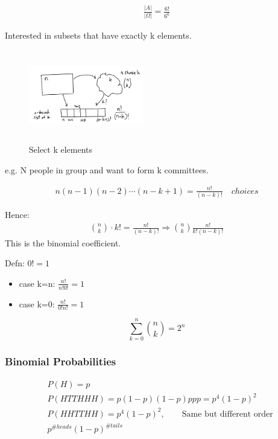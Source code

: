 \begin{align*}
\frac{|A|}{|\Omega|} = \frac{6!}{6^6}
\end{align*}


Interested in subsets that have exactly k elements.

\begin{figure}[ht]
\centering
\includegraphics[width=5cm, height=4cm]{images/L04/sel_k_elems.jpeg}
\caption{Select k elements}
\end{figure}

e.g. N people in group and want to form k committees.

\begin{align*}
n(n-1)(n-2)\cdots (n-k+1)=\frac{n!}{(n-k)!} \quad choices
\end{align*}


Hence:
\begin{align*}
\binom{n}{k}\cdot k! = \frac{n!}{(n-k)!} \Rightarrow \binom{n}{k}\frac{n!}{k!(n-k)!}
\end{align*}
This is the binomial coefficient.


Defn: $0! = 1$

\begin{itemize}
    \item case k=n: $\frac{n!}{n!0!}=1$
    \item case k=0: $\frac{n!}{0!n!}=1$ 
\end{itemize}



$$\sum_{k=0}^n \binom{n}{k} = 2^n$$ 

\subsubsection{Binomial Probabilities}


\begin{align*}
&P(H)=p\\
&P(HTTHHH)=p(1-p)(1-p)ppp = p^4(1-p)^2\\
&P(HHTTHH)= p^4(1-p)^2, \qquad \text{Same but different order}\\
&p^{\#heads}(1-p)^{\#tails}
\end{align*}

